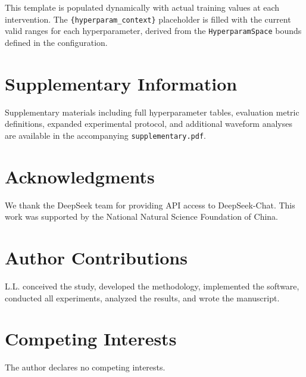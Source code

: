 \documentclass[11pt,a4paper]{article}
\begin{document}
This template is populated dynamically with actual training values at each
intervention. The \texttt{\{hyperparam\_context\}} placeholder is filled
with the current valid ranges for each hyperparameter, derived from the
\texttt{HyperparamSpace} bounds defined in the configuration.

\section*{Supplementary Information}
Supplementary materials including full hyperparameter tables, evaluation metric
definitions, expanded experimental protocol, and additional waveform analyses
are available in the accompanying \texttt{supplementary.pdf}.

\section*{Acknowledgments}
We thank the DeepSeek team for providing API access to DeepSeek-Chat.
This work was supported by the National Natural Science Foundation of China.

\section*{Author Contributions}
L.L. conceived the study, developed the methodology, implemented the software,
conducted all experiments, analyzed the results, and wrote the manuscript.

\section*{Competing Interests}
The author declares no competing interests.
\end{document}
